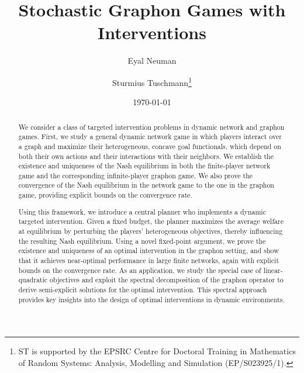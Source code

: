 \documentclass[11pt]{article}
\date{\today}
\title{Stochastic Graphon Games with Interventions}
\author[]{Eyal Neuman}
\author[]{Sturmius Tuschmann\thanks{ST is supported by the EPSRC Centre for Doctoral Training in Mathematics of Random \mbox{Systems}: Analysis, Modelling and Simulation (EP/S023925/1).}}
\affil[]{Department of Mathematics, Imperial College London}
\numberwithin{equation}{section}
\begin{document}
\maketitle

\begin{abstract} 
We consider a class of targeted intervention problems in dynamic network and graphon games. First, we study a general dynamic network game in which players interact over a graph and maximize their heterogeneous, concave goal functionals, which depend on both their own actions and their interactions with their neighbors.
We establish the existence and uniqueness of the Nash equilibrium in both the finite-player network game and the corresponding infinite-player graphon game. We also prove the convergence of the Nash equilibrium in the network game to the one in the graphon game, providing explicit bounds on the convergence rate.

Using this framework, we introduce a central planner who implements a dynamic targeted intervention. Given a fixed budget, the planner maximizes the average welfare at equilibrium by perturbing the players' heterogeneous objectives, thereby influencing the resulting Nash equilibrium.
Using a novel fixed-point argument, we prove the existence and uniqueness of an optimal intervention in the graphon setting, and show that it achieves near-optimal performance in large finite networks, again with explicit bounds on the convergence rate.
As an application, we study the special case of linear-quadratic objectives and exploit the spectral decomposition of the graphon operator to derive semi-explicit solutions for the optimal intervention. This spectral approach provides key insights into the design of optimal interventions in dynamic environments.




\end{abstract} 
\end{document}
